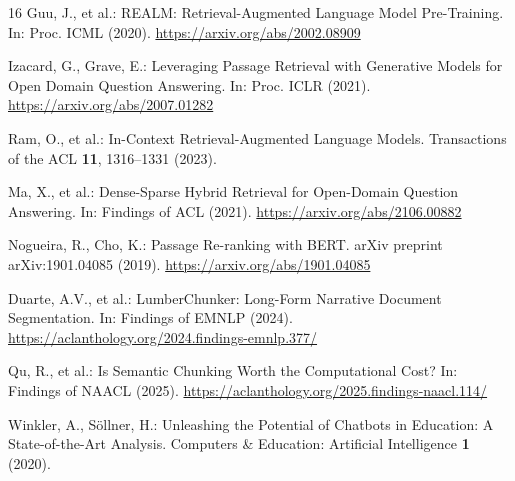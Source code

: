 \documentclass[runningheads]{llncs}
\begin{document}
\begin{thebibliography}{16}
Guu, J., et al.: REALM: Retrieval-Augmented Language Model Pre-Training. In: Proc. ICML (2020). \url{https://arxiv.org/abs/2002.08909}

Izacard, G., Grave, E.: Leveraging Passage Retrieval with Generative Models for Open Domain Question Answering. In: Proc. ICLR (2021). \url{https://arxiv.org/abs/2007.01282}

Ram, O., et al.: In-Context Retrieval-Augmented Language Models. Transactions of the ACL \textbf{11}, 1316--1331 (2023). 

Ma, X., et al.: Dense-Sparse Hybrid Retrieval for Open-Domain Question Answering. In: Findings of ACL (2021). \url{https://arxiv.org/abs/2106.00882}

Nogueira, R., Cho, K.: Passage Re-ranking with BERT. arXiv preprint arXiv:1901.04085 (2019). \url{https://arxiv.org/abs/1901.04085}

Duarte, A.V., et al.: LumberChunker: Long-Form Narrative Document Segmentation. In: Findings of EMNLP (2024). \url{https://aclanthology.org/2024.findings-emnlp.377/}

Qu, R., et al.: Is Semantic Chunking Worth the Computational Cost? In: Findings of NAACL (2025). \url{https://aclanthology.org/2025.findings-naacl.114/}

Winkler, A., S\"{o}llner, H.: Unleashing the Potential of Chatbots in Education: A State-of-the-Art Analysis. Computers \& Education: Artificial Intelligence \textbf{1} (2020). 

\end{thebibliography}
\end{document}
